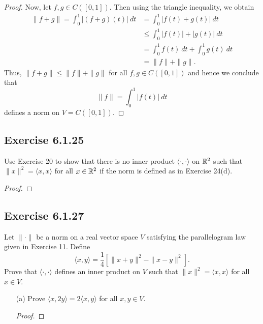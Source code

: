 \begin{enumerate}
\begin{proof}
        Now, let \( f,g \in C([0,1]) \). Then using the triangle inequality, we obtain
        \begin{align*}
            \| f + g \| = \int_{ 0 }^{ 1 } | (f+g)(t) |  \ dt &= \int_{ 0 }^{ 1 }  | f(t) + g(t) |  \ dt \\
                                                              &\leq \int_{ 0 }^{ 1 } | f(t) |  + | g(t) |  \ dt \\
                                                              &= \int_{ 0 }^{ 1 } f(t)  \ dt + \int_{ 0 }^{ 1 }  g(t) \ dt \\
                                                              &= \|f\| + \|g\|.
        \end{align*}
        Thus, \( \|f+g\| \leq \|f\| + \|g\| \) for all \( f,g \in C([0,1]) \) and hence we conclude that
        \[ \|f\| = \int_{ 0 }^{ 1 } | f(t) |  \ dt  \]
        defines a norm on \( V = C([0,1])  \).
        \end{proof}
\end{enumerate}

\subsection*{Exercise 6.1.25} Use Exercise 20 to show that there is no inner product \( \langle \cdot , \cdot \rangle \) on \( \mathbb{R}^{2} \) such that \( \|x\|^{2} = \langle x , x \rangle \) for all \( x \in \mathbb{R}^{2} \) if the norm is defined as in Exercise 24(d).
\begin{proof}

\end{proof}

\subsection*{Exercise 6.1.27} Let \( \| \cdot \|  \) be a norm on a real vector space \( V  \) satisfying the parallelogram law given in Exercise 11. Define 
\[  \langle  x , y \rangle = \frac{ 1 }{ 4 }  [ \|x + y\|^{2} - \|x - y\|^{2}]. \]
Prove that \( \langle \cdot , \cdot \rangle  \) defines an inner product on \( V  \) such that \( \|x \|^{2} = \langle x , x \rangle \) for all \( x \in V  \).

\begin{enumerate}
    \item[(a)] Prove \( \langle x , 2y \rangle = 2 \langle x , y \rangle \) for all \( x,y \in V  \).
        \begin{proof}
        
        \end{proof}
\end{enumerate}

